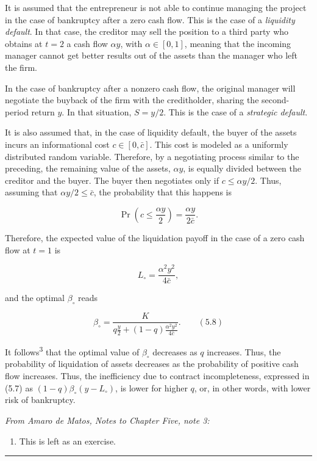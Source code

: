 \documentclass[11pt,a4paper]{article}
\providecommand{\tightlist}{\setlength{\itemsep}{0pt}\setlength{\parskip}{0pt}}
\newcommand{\stmtend}{\par\endgroup\nopagebreak\noindent\rule{\linewidth}{0.4pt}\par\medskip}
\begin{document}
It is assumed that the entrepreneur is not able to continue managing the project in the case of
bankruptcy after a zero cash flow. This is the case of a \emph{liquidity default}. In that case, the
creditor may sell the position to a third party who obtains at \(t = 2\) a cash flow \(\alpha y\),
with \(\alpha \in [0, 1]\), meaning that the incoming manager cannot get better results out of the
assets than the manager who left the firm.

In the case of bankruptcy after a nonzero cash flow, the original manager will negotiate the buyback
of the firm with the creditholder, sharing the second-period return \(y\). In that situation,
\(S = y/2\). This is the case of a \emph{strategic default}.

It is also assumed that, in the case of liquidity default, the buyer of the assets incurs an
informational cost \(c \in [0, \bar c]\). This cost is modeled as a uniformly distributed random
variable. Therefore, by a negotiating process similar to the preceding, the remaining value of the
assets, \(\alpha y\), is equally divided between the creditor and the buyer. The buyer then
negotiates only if \(c \leq \alpha y/2\). Thus, assuming that \(\alpha y/2 \leq \bar c\), the
probability that this happens is

\[\Pr\left(c \leq \frac{\alpha y}{2}\right) = \frac{\alpha y}{2\bar c}.\]

Therefore, the expected value of the liquidation payoff in the case of a zero cash flow at \(t = 1\)
is

\[L_\circ = \frac{\alpha^2 y^2}{4\bar c},\]

and the optimal \(\beta_\circ\) reads

\[\beta_\circ = \frac{K}{q\frac{y}{2} + (1 - q)\frac{\alpha^2 y^2}{4\bar c}}. \qquad (5.8)\]

It follows\textsuperscript{3} that the optimal value of \(\beta_\circ\) decreases as \(q\)
increases. Thus, the probability of liquidation of assets decreases as the probability of positive
cash flow increases. Thus, the inefficiency due to contract incompleteness, expressed in (5.7) as
\((1 - q)\beta_\circ(y - L_\circ)\), is lower for higher \(q\), or, in other words, with lower risk
of bankruptcy.

\emph{From Amaro de Matos, Notes to Chapter Five, note 3:}

\begin{enumerate}
\def\labelenumi{\arabic{enumi}.}
\setcounter{enumi}{2}
\tightlist
\item
  This is left as an exercise.
\end{enumerate}
\stmtend
\end{document}
